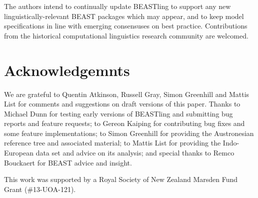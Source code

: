 \documentclass[twocolumn,10pt]{scrartcl}
\begin{document}
The authors intend to continually update BEASTling to support any new linguistically-relevant BEAST packages which may appear, and to keep model specifications in line with emerging consensuses on best practice.  Contributions from the historical computational linguistics research community are welcomed.

\section{Acknowledgemnts}

We are grateful to Quentin Atkinson, Russell Gray, Simon Greenhill and Mattis List for comments and suggestions on draft versions of this paper.  Thanks to Michael Dunn for testing early versions of BEASTling and submitting bug reports and feature requests; to Gereon Kaiping for contributing bug fixes and some feature implementations; to Simon Greenhill for providing the Austronesian reference tree and associated material; to Mattis List for providing the Indo-European data set and advice on its analysis; and special thanks to Remco Bouckaert for BEAST advice and insight.

This work was supported by a Royal Society of New Zealand Marsden Fund Grant (\#13-UOA-121).




\end{document}

